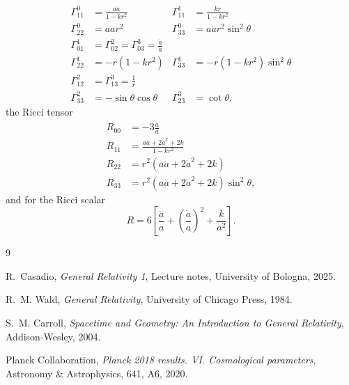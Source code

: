 \documentclass[12pt,letterpaper]{article}         %
\begin{document}
\begin{equation}
\begin{aligned}
\Gamma^0_{11} &= \frac{a\dot{a}}{1-k r^2} & \Gamma^1_{11} &= \frac{k r}{1-k r^2} \\
\Gamma^0_{22} &= a\dot{a}r^2 & \Gamma^0_{33} &= a\dot{a}r^2 \sin^2 \theta \\
\Gamma^1_{01} &= \Gamma^2_{02} = \Gamma^3_{03} = \frac{\dot{a}}{a} \\
\Gamma^1_{22} &= -r(1-k r^2) & \Gamma^1_{33} &= -r(1-k r^2) \sin^2 \theta \\
\Gamma^2_{12} &= \Gamma^3_{13} = \frac{1}{r} & \\
\Gamma^2_{33} &= -\sin \theta \cos \theta & \Gamma^3_{23} &= \cot \theta,
\end{aligned}
\end{equation}
the Ricci tensor
\begin{equation}
\begin{aligned}
R_{00} &= -3\frac{\ddot{a}}{a} \\
R_{11} &= \frac{a\ddot{a} + 2\dot{a}^2 + 2k}{1 - k r^2} \\
R_{22} &= r^2(a\ddot{a} + 2\dot{a}^2 + 2k) \\
R_{33} &= r^2(a\ddot{a} + 2\dot{a}^2 + 2k) \sin^2 \theta,
\end{aligned}
\end{equation}
and for the Ricci scalar
\begin{equation}
R = 6 \left[ \frac{\ddot{a}}{a} + \left( \frac{\dot{a}}{a} \right)^2 + \frac{k}{a^2} \right].
\end{equation}


\newpage
\begin{thebibliography}{9}

R.~Casadio, \textit{General Relativity 1}, Lecture notes, University of Bologna, 2025.

R.~M. Wald, \textit{General Relativity}, University of Chicago Press, 1984.

S.~M. Carroll, \textit{Spacetime and Geometry: An Introduction to General Relativity}, Addison-Wesley, 2004.

Planck Collaboration, \textit{Planck 2018 results. VI. Cosmological parameters}, Astronomy \& Astrophysics, 641, A6, 2020.


\end{thebibliography}
\end{document}
